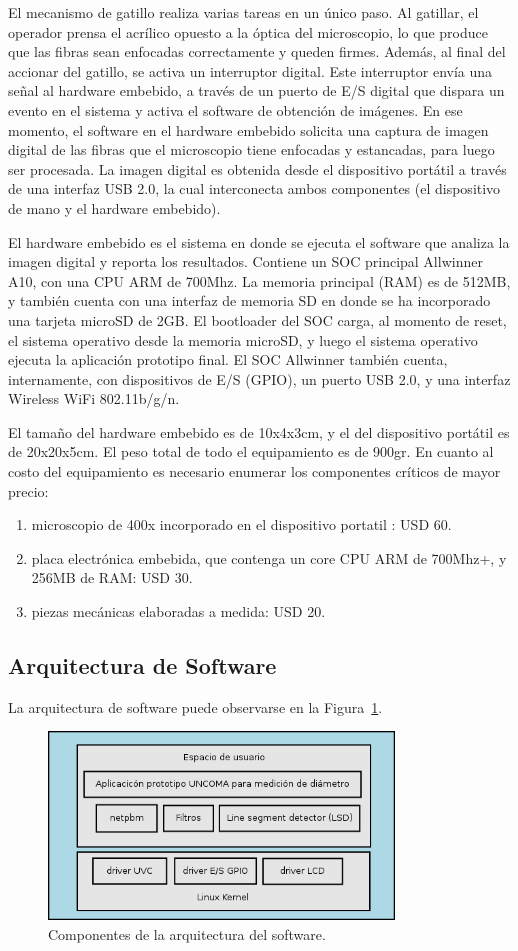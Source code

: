 \documentclass[runningheads,a4paper]{llncs}
\begin{document}
El mecanismo de gatillo realiza varias tareas en un único paso. Al gatillar, el operador prensa el acrílico opuesto a la óptica del microscopio, lo que produce que las fibras sean enfocadas correctamente y queden firmes. Además, al final del accionar del gatillo, se activa un interruptor digital. Este interruptor envía una señal al hardware embebido, a través de un puerto de E/S digital que dispara un evento en el sistema y activa el software de obtención de imágenes.
En ese momento, el software en el hardware embebido solicita una captura de imagen digital de las fibras que el microscopio tiene enfocadas y estancadas, para luego ser procesada. La imagen digital es obtenida desde el dispositivo portátil a través de una interfaz USB 2.0, la cual interconecta ambos componentes (el dispositivo de mano y el hardware embebido).

El hardware embebido es el sistema en donde se ejecuta el software
que analiza la imagen digital y reporta los resultados. Contiene un SOC principal Allwinner A10, con una CPU ARM de 700Mhz. La memoria principal (RAM) es de 512MB, y también cuenta con una interfaz de memoria SD en donde se ha incorporado una tarjeta microSD de 2GB. El bootloader del SOC carga, al momento de reset, el sistema
operativo desde la memoria microSD, y luego el sistema operativo ejecuta
la aplicación prototipo final.
El SOC Allwinner también cuenta, internamente, con dispositivos de E/S (GPIO), un puerto USB 2.0, y una interfaz Wireless WiFi 802.11b/g/n.

El tamaño del hardware embebido es de 10x4x3cm, y el del dispositivo portátil es de 20x20x5cm. El peso total de todo el equipamiento es de 900gr. 
En cuanto al costo del equipamiento es necesario enumerar los componentes
críticos de mayor precio:
\begin{enumerate}
\item microscopio de 400x incorporado en el dispositivo portatil : USD 60.
\item placa electrónica embebida, que contenga un core CPU ARM de 700Mhz+, y 256MB de RAM: USD 30.
\item piezas mecánicas elaboradas a medida: USD 20.
\end{enumerate}


\subsection{Arquitectura de Software}


La arquitectura de software puede observarse en la Figura~\ref{fig:arqsoft}.
\begin{figure}
\centering
\includegraphics[height=5cm]{arqsoft}
\caption{Componentes de la arquitectura del software.}
\label{fig:arqsoft}
\end{figure}
\end{document}
